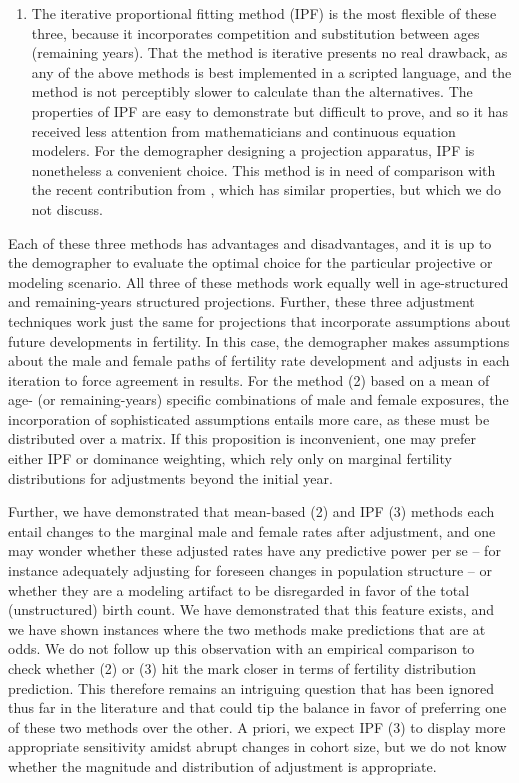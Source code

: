 \begin{enumerate}
\item The iterative proportional fitting method (IPF) is the most flexible of
these three, because it incorporates competition and substitution between ages (remaining
years). That the
method is iterative presents no real drawback, as any of the above methods is best 
implemented in a scripted language, and the method is
not perceptibly slower to calculate than the alternatives. The properties of
IPF are easy to demonstrate but difficult to prove, and so it has received less attention from
mathematicians and continuous equation modelers. For the demographer designing
a projection apparatus, IPF is nonetheless a convenient choice. This method is in need of
comparison with the recent contribution from \citet{choo2006estimating}, which
has similar properties, but which we do not discuss.
\end{enumerate}

Each of these three methods has advantages and disadvantages, and it is up to
the demographer to evaluate the optimal choice for the particular projective or
modeling scenario. All three of these methods work equally well in
age-structured and remaining-years structured projections. Further, these three
adjustment techniques work just the same for projections that incorporate
assumptions about future developments in fertility. In this case, the
demographer makes assumptions about the male and female paths of fertility 
rate development and adjusts in each
iteration to force agreement in results. For the method (2) based on a mean of
age- (or remaining-years) specific combinations of male and female exposures,
the incorporation of sophisticated assumptions entails more care, as these must be
distributed over a matrix. If this proposition is inconvenient, one may prefer
either IPF or dominance weighting, which rely only on marginal fertility
distributions for adjustments beyond the initial year.

Further, we have demonstrated that mean-based (2) and IPF (3) methods each
entail changes to the marginal male and female rates after adjustment, and one
may wonder whether these adjusted rates have any predictive power per se -- for
instance adequately adjusting for foreseen changes in population structure --
or whether they are a modeling artifact to be disregarded in favor of the total 
(unstructured) birth count. We have demonstrated that this feature exists,
and we have shown instances where the two methods make predictions that are at
odds. We do not follow up this observation with an empirical comparison
to check whether (2) or (3) hit the mark closer in terms of
fertility distribution prediction. This therefore remains an intriguing question
that has been ignored thus far in the literature and that could tip the balance
in favor of preferring one of these two methods over the other. A priori, we expect IPF (3) 
to display more appropriate sensitivity amidst abrupt
changes in cohort size, but we do not know whether the magnitude and
distribution of adjustment is appropriate. 

